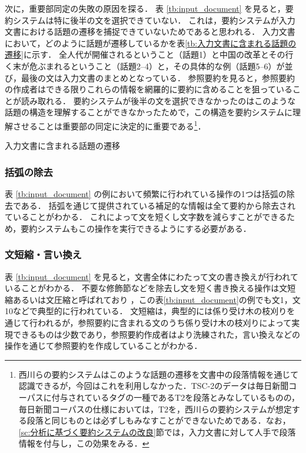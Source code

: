 次に，重要部同定の失敗の原因を探る．
表 \ref{tb:input_document} を見ると，要約システムは特に後半の文を選択できていない．
これは，要約システムが入力文書における話題の遷移を捕捉できていないためであると思われる．
入力文書において，どのように話題が遷移しているかを表\ref{tb:入力文書に含まれる話題の遷移}に示す．
全人代が開催されるということ（話題1）と中国の改革とその行く末が危ぶまれるということ（話題2--4）と，その具体的な例（話題5--6）が並び，最後の文は入力文書のまとめとなっている．
参照要約を見ると，参照要約の作成者はできる限りこれらの情報を網羅的に要約に含めることを狙っていることが読み取れる．
要約システムが後半の文を選択できなかったのはこのような話題の構造を理解することができなかったためで，この構造を要約システムに理解させることは重要部の同定に決定的に重要である\footnote{
西川らの要約システムはこのような話題の遷移を文書中の段落情報を通じて認識できるが，今回はこれを利用しなかった．TSC-2のデータは毎日新聞コーパスに付与されているタグの一種であるT2を段落とみなしているものの，毎日新聞コーパスの仕様においては，T2を，西川らの要約システムが想定する段落と同じものとは必ずしもみなすことができないためである．なお，\ref{sc:分析に基づく要約システムの改良}節では，入力文書に対して人手で段落情報を付与し，この効果をみる．}．

\begin{table}[b]
\caption{入力文書に含まれる話題の遷移}
\label{tb:入力文書に含まれる話題の遷移}

\end{table}


\subsubsection{括弧の除去}

表 \ref{tb:input_document} の例において頻繁に行われている操作の1つは括弧の除去である．
括弧を通じて提供されている補足的な情報は全て要約から除去されていることがわかる．
これによって文を短くし文字数を減らすことができるため，要約システムもこの操作を実行できるようにする必要がある．


\subsubsection{文短縮・言い換え}

表 \ref{tb:input_document} を見ると，文書全体にわたって文の書き換えが行われていることがわかる．
不要な修飾節などを除去し文を短く書き換える操作は文短縮あるいは文圧縮と呼ばれており \cite{nenkova11}，この表\ref{tb:input_document}の例でも文1，文10などで典型的に行われている．
文短縮は，典型的には係り受け木の枝刈りを通じて行われるが，参照要約に含まれる文のうち係り受け木の枝刈りによって実現できるものは少数であり，参照要約作成者はより洗練された，言い換えなどの操作を通じて参照要約を作成していることがわかる．


